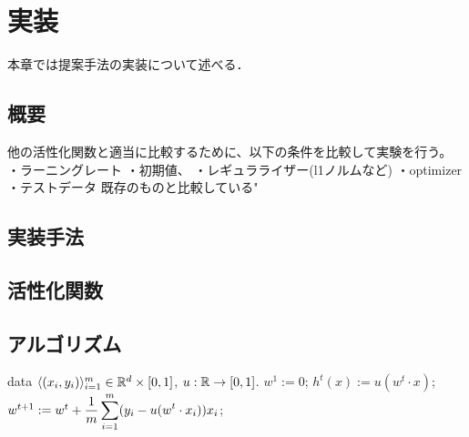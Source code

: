 \chapter{実装}
\label{implementation}

本章では提案手法の実装について述べる．

\section{概要}
他の活性化関数と適当に比較するために、以下の条件を比較して実験を行う。
・ラーニングレート
・初期値、
・レギュラライザー(l1ノルムなど)
・optimizer
・テストデータ
既存のものと比較している"


\section{実装手法}
\section{活性化関数}
\section{アルゴリズム}


\begin{algorithm}[!t]
	\caption{\GLMt}
	\label{alg:fixed-u-alg}
\begin{algorithmic}
	 data $\langle (x_i, y_i) \rangle_{i=1}^m \in
	\mathbb{R}^d \times [0, 1]$, $u: \mathbb{R} \rightarrow [0, 1]$.
	\STATE $w^1 := 0$;
	\STATE $h^t(x) := u(w^t \cdot x)$;
	\STATE $w^{t+1} := w^t + \displaystyle\frac{1}{m} \sum_{i=1}^m (y_i - u(w^t
	\cdot x_i)) x_i$;
	\ENDFOR
\end{algorithmic}
\end{algorithm}


\section{}
\section{}

